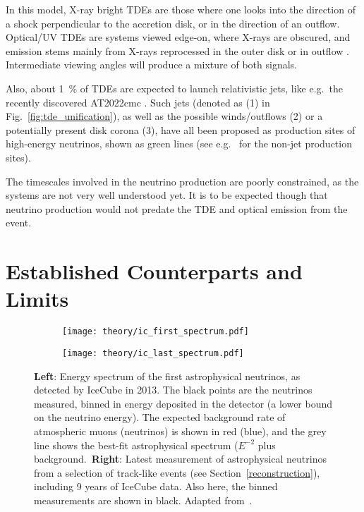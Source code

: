 In this model, X-ray bright TDEs are those where one looks into the direction of a shock perpendicular to the accretion disk, or in the direction of an outflow. Optical/UV TDEs are systems viewed edge-on, where X-rays are obscured, and emission stems mainly from X-rays reprocessed in the outer disk or in outflow . Intermediate viewing angles will produce a mixture of both signals.

Also, about \SI{1}{\percent} of TDEs are expected to launch relativistic jets, like e.g.\ the recently discovered AT2022cmc . Such jets (denoted as (1) in Fig.~\ref{fig:tde_unification}), as well as the possible winds/outflows (2) or a potentially present disk corona (3), have all been proposed as production sites of high-energy neutrinos, shown as green lines (see e.g.\  for the non-jet production sites).

The timescales involved in the neutrino production are poorly constrained, as the systems are not very well understood yet. It is to be expected though that neutrino production would not predate the TDE and optical emission from the event.

\section{Established Counterparts and Limits}

\begin{figure}[htb]
    \centering
    \begin{subfigure}[b]{0.52\textwidth}
        \centering
        \texttt{[image: theory/ic\_first\_spectrum.pdf]}
    \end{subfigure}
    \begin{subfigure}[b]{0.47\textwidth}
        \centering
        \texttt{[image: theory/ic\_last\_spectrum.pdf]}
    \end{subfigure}
    \caption[Astrophysical neutrino spectrum]{\textbf{Left}: Energy spectrum of the first astrophysical neutrinos, as detected by IceCube in 2013. The black points are the neutrinos measured, binned in energy deposited in the detector (a lower bound on the neutrino energy). The expected background rate of atmospheric muons (neutrinos) is shown in red (blue), and the grey line shows the best-fit astrophysical spectrum ($E^{-2}$ plus background.\ \textbf{Right}: Latest measurement of astrophysical neutrinos from a selection of track-like events (see Section~\ref{reconstruction}), including 9 years of IceCube data. Also here, the binned measurements are shown in black. Adapted from~\cite{Aartsen2013,Abbasi2022b}.}
\end{figure}

